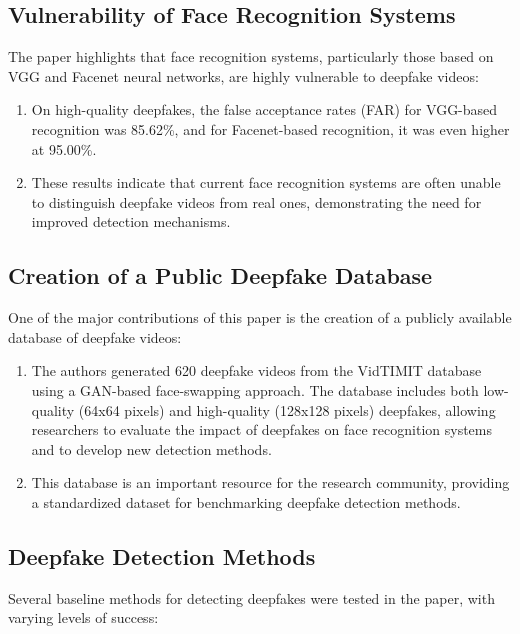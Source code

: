 \documentclass{report}
\begin{document}
	\subsection{Vulnerability of Face Recognition Systems}
	The paper highlights that face recognition systems, particularly those based on VGG and Facenet neural networks, are highly vulnerable to deepfake videos:
	
	\begin{enumerate}
		\item 
		On high-quality deepfakes, the false acceptance rates (FAR) for VGG-based recognition was 85.62\%, and for Facenet-based recognition, it was even higher at 95.00\%.
		
		\item 
		These results indicate that current face recognition systems are often unable to distinguish deepfake videos from real ones, demonstrating the need for improved detection mechanisms.
	\end{enumerate}
	
	\subsection{Creation of a Public Deepfake Database}
	One of the major contributions of this paper is the creation of a publicly available database of deepfake videos:
	
	\begin{enumerate}
		\item 
		The authors generated 620 deepfake videos from the VidTIMIT database using a GAN-based face-swapping approach. The database includes both low-quality (64x64 pixels) and high-quality (128x128 pixels) deepfakes, allowing researchers to evaluate the impact of deepfakes on face recognition systems and to develop new detection methods.
		
		\item 
		This database is an important resource for the research community, providing a standardized dataset for benchmarking deepfake detection methods.
	\end{enumerate}
	
	
	\subsection{Deepfake Detection Methods}
	Several baseline methods for detecting deepfakes were tested in the paper, with varying levels of success:
	
\end{document}
